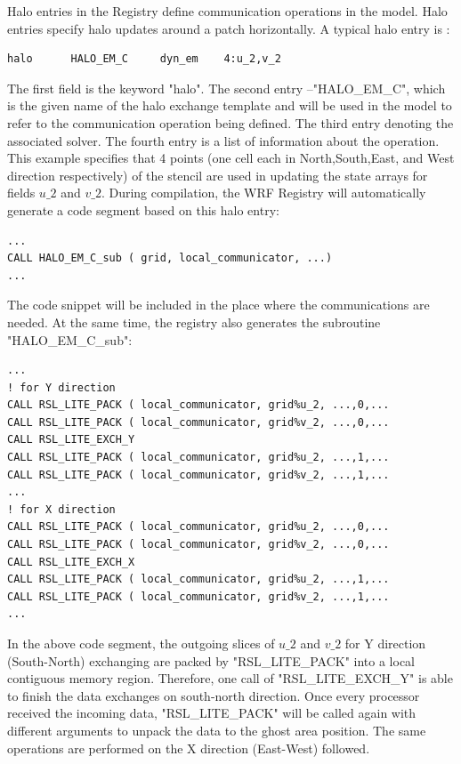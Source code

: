 \documentclass[12pt]{article}
\begin{document}
Halo entries in the Registry define communication operations in the model. Halo entries specify halo updates around a patch horizontally. A typical halo entry is :
\begin{Verbatim}[frame=single]
halo      HALO_EM_C     dyn_em    4:u_2,v_2
\end{Verbatim}
The first field is the keyword "halo". The second entry --"HALO\_EM\_C", which is the given name of the halo exchange template and will be used in the model to refer to the communication operation being defined. The third entry denoting the associated solver. The fourth entry is a list of information about the operation. This example specifies that 4 points (one cell each in North,South,East, and West direction respectively) of the stencil are used in updating the state arrays for fields $u\_2$ and $v\_2$. During compilation, the WRF Registry will automatically generate a code segment based on this halo entry: 
\begin{Verbatim}[frame=single]
...
CALL HALO_EM_C_sub ( grid, local_communicator, ...)
...
\end{Verbatim}
The code snippet will be included in the place where the communications are needed. At the same time, the registry also generates the subroutine "HALO\_EM\_C\_sub":
\begin{Verbatim}[frame=single]
...
! for Y direction
CALL RSL_LITE_PACK ( local_communicator, grid%u_2, ...,0,...
CALL RSL_LITE_PACK ( local_communicator, grid%v_2, ...,0,...
CALL RSL_LITE_EXCH_Y
CALL RSL_LITE_PACK ( local_communicator, grid%u_2, ...,1,...
CALL RSL_LITE_PACK ( local_communicator, grid%v_2, ...,1,...
...
! for X direction
CALL RSL_LITE_PACK ( local_communicator, grid%u_2, ...,0,...
CALL RSL_LITE_PACK ( local_communicator, grid%v_2, ...,0,...
CALL RSL_LITE_EXCH_X
CALL RSL_LITE_PACK ( local_communicator, grid%u_2, ...,1,...
CALL RSL_LITE_PACK ( local_communicator, grid%v_2, ...,1,...
...
\end{Verbatim}
In the above code segment, the outgoing slices of $u\_2$ and $v\_2$ for Y direction (South-North) exchanging are packed by "RSL\_LITE\_PACK" into a local contiguous memory region. Therefore, one call of "RSL\_LITE\_EXCH\_Y" is able to finish the data exchanges on south-north direction. Once every processor received the incoming data, "RSL\_LITE\_PACK" will be called again with different arguments to unpack the data to the ghost area position.  The same operations are performed on the X direction (East-West) followed.
\end{document}
